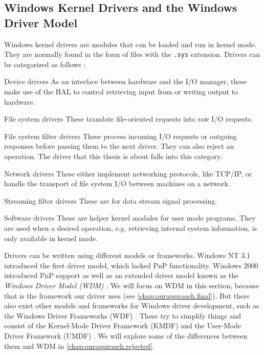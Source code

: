 \subsection{Windows Kernel Drivers and the Windows Driver Model}
\label{chap:background.kerneldriver.wdm}
Windows kernel drivers are modules that can be loaded and run in kernel mode. They are normally found in the form of files with the \texttt{.sys} extension. Drivers can be categorized as follows \cite{Yosifovich2017}:
\begin{descitemize}
	\item[Device drivers] As an interface between hardware and the I/O manager, these make use of the HAL to control retrieving input from or writing output to hardware.
	\item[File system drivers] These translate file-oriented requests into raw I/O requests.
	\item[File system filter drivers] These process incoming I/O requests or outgoing responses before passing them to the next driver. They can also reject an operation. The driver that this thesis is about falls into this category.
	\item[Network drivers] These either implement networking protocols, like TCP/IP, or handle the transport of file system I/O between machines on a network.
	\item[Streaming filter drivers] These are for data stream signal processing.
	\item[Software drivers] These are helper kernel modules for user mode programs. They are used when a desired operation, e.g. retrieving internal system information, is only available in kernel mode.
\end{descitemize}

Drivers can be written using different models or frameworks. Windows NT 3.1 introduced the first driver model, which lacked PnP functionality. Windows 2000 introduced PnP support as well as an extended driver model known as the \emph{Windows Driver Model (WDM)} \cite{Yosifovich2017}. We will focus on WDM in this section, because that is the framework our driver uses (see \autoref{chap:ourapproach.final}). But there also exist other models and frameworks for Windows driver development, such as the Windows Driver Frameworks (WDF) \cite{Wdf}. These try to simplify things and consist of the Kernel-Mode Driver Framework (KMDF) and the User-Mode Driver Framework (UMDF) \cite{Yosifovich2017}. We will explore some of the differences between them and WDM in \autoref{chap:ourapproach.rejected}.

